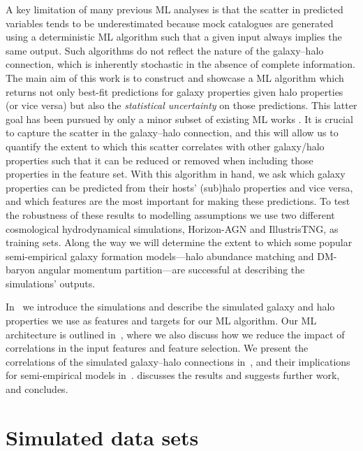 \documentclass[useAMS,usenatbib]{mnras}
\begin{document}
A key limitation of many previous ML analyses is that the scatter in predicted variables tends to be underestimated \citep{Kamdar_2016,Agarwal_2018} because mock catalogues are generated using a deterministic ML algorithm such that a given input always implies the same output. Such algorithms do not reflect the nature of the galaxy--halo connection, which is inherently stochastic in the absence of complete information. The main aim of this work is to construct and showcase a ML algorithm which returns not only best-fit predictions for galaxy properties given halo properties (or vice versa) but also the \emph{statistical uncertainty} on those predictions. This latter goal has been pursued by only a minor subset of existing ML works \citep[e.g.][]{Ramanah2020MLUncertainties, Ramanah2021MLUncertainties, Ho2021MLUncertainties, Eisert2022ErgoML}. It is crucial to capture the scatter in the galaxy--halo connection, and this will allow us to quantify the extent to which this scatter correlates with other galaxy/halo properties such that it can be reduced or removed when including those properties in the feature set. With this algorithm in hand, we ask which galaxy properties can be predicted from their hosts' (sub)halo properties and vice versa, and which features are the most important for making these predictions. To test the robustness of these results to modelling assumptions we use two different cosmological hydrodynamical simulations, Horizon-AGN and IllustrisTNG, as training sets. Along the way we will determine the extent to which some popular semi-empirical galaxy formation models---halo abundance matching and DM-baryon angular momentum partition---are successful at describing the simulations' outputs.

In~ we introduce the simulations and describe the simulated galaxy and halo properties we use as features and targets for our ML algorithm. Our ML architecture is outlined in~, where we also discuss how we reduce the impact of correlations in the input features and feature selection. We present the correlations of the simulated galaxy--halo connections in~, and their implications for semi-empirical models in~.  discusses the results and suggests further work, and  concludes.

\section{Simulated data sets}\label{sec:Data sets}
\end{document}
